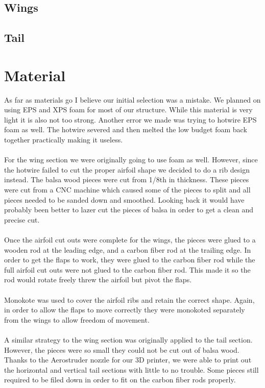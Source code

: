\documentclass{report}
\begin{document}
\subsection{Wings}
\subsection{Tail}
\section{Material}
As far as materials go I believe our initial selection was a mistake. We planned on using EPS and XPS foam for most of our structure. While this material is very light it is also not too strong. Another error we made was trying to hotwire EPS foam as well. The hotwire severed and then melted the low budget foam back together practically making it useless. 
\\
\\For the wing section we were originally going to use foam as well. However, since the hotwire failed to cut the proper airfoil shape we decided to do a rib design instead. The balsa wood pieces were cut from 1/8th in thickness. These pieces were cut from a CNC machine which caused some of the pieces to split and all pieces needed to be sanded down and smoothed. Looking back it would have probably been better to lazer cut the pieces of balsa in order to get a clean and precise cut. 
\\
\\Once the airfoil cut outs were complete for the wings, the pieces were glued to a wooden rod at the leading edge, and a carbon fiber rod at the trailing edge. In order to get the flaps to work, they were glued to the carbon fiber rod while the full airfoil cut outs were not glued to the carbon fiber rod. This made it so the rod would rotate freely threw the airfoil but pivot the flaps.
\\
\\Monokote was used to cover the airfoil ribs and retain the correct shape. Again, in order to allow the flaps to move correctly they were monokoted separately from the wings to allow freedom of movement.
\\
\\A similar strategy to the wing section was originally applied to the tail section. However, the pieces were so small they could not be cut out of balsa wood. Thanks to the Aerostruder nozzle for our 3D printer, we were able to print out the horizontal and vertical tail sections with little to no trouble. Some pieces still required to be filed down in order to fit on the carbon fiber rods properly.
\end{document}
